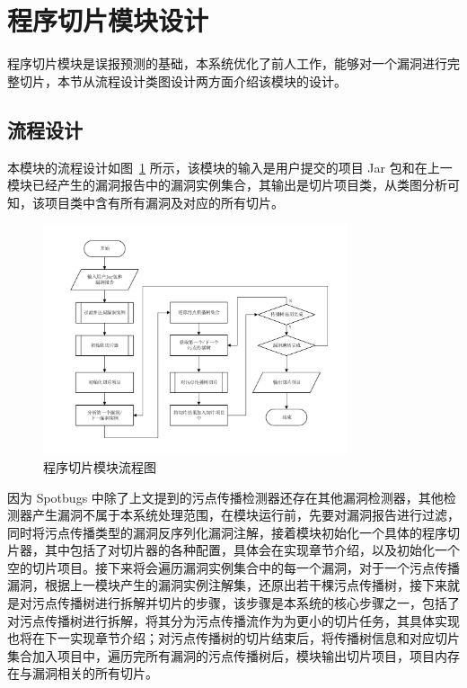 \section{程序切片模块设计}

程序切片模块是误报预测的基础，本系统优化了前人工作，能够对一个漏洞进行完整切片，本节从流程设计类图设计两方面介绍该模块的设计。\\
\subsection{流程设计}

本模块的流程设计如图~\ref{sliceProcessing} 所示，该模块的输入是用户提交的项目 Jar 包和在上一模块已经产生的漏洞报告中的漏洞实例集合，其输出是切片项目类，从类图分析可知，该项目类中含有所有漏洞及对应的所有切片。

\begin{figure}[!htb]
    \centering
    \includegraphics[width=0.8\textwidth]{FIGs/chapter3/sliceProcessing.pdf}
    \caption{程序切片模块流程图}\label{sliceProcessing}
\end{figure}

因为 Spotbugs 中除了上文提到的污点传播检测器还存在其他漏洞检测器，其他检测器产生漏洞不属于本系统处理范围，在模块运行前，先要对漏洞报告进行过滤，同时将污点传播类型的漏洞反序列化漏洞注解，接着模块初始化一个具体的程序切片器，其中包括了对切片器的各种配置，具体会在实现章节介绍，以及初始化一个空的切片项目。接下来将会遍历漏洞实例集合中的每一个漏洞，对于一个污点传播漏洞，根据上一模块产生的漏洞实例注解集，还原出若干棵污点传播树，接下来就是对污点传播树进行拆解并切片的步骤，该步骤是本系统的核心步骤之一，包括了对污点传播树进行拆解，将其分为污点传播流作为为更小的切片任务，其具体实现也将在下一实现章节介绍；对污点传播树的切片结束后，将传播树信息和对应切片集合加入项目中，遍历完所有漏洞的污点传播树后，模块输出切片项目，项目内存在与漏洞相关的所有切片。\\

